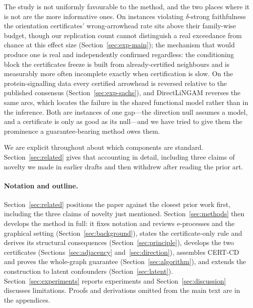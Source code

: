 \documentclass[pdflatex,sn-apa]{sn-jnl}
\theoremstyle{thmstyleone}%
\theoremstyle{thmstyletwo}%
\theoremstyle{thmstylethree}%
\begin{document}
The study is not uniformly favourable to the method, and the two places where
it is not are the more informative ones. On instances violating
$\delta$-strong faithfulness the orientation certificates' wrong-arrowhead
rate sits above their family-wise budget, though our replication count cannot
distinguish a real exceedance from chance at this effect size
(Section~\ref{sec:exp-main}); the mechanism that would produce one is real
and independently confirmed regardless: the conditioning block the
certificates freeze is built from already-certified neighbours and is
measurably more often incomplete exactly when certification is slow. On the
protein-signalling data
every certified arrowhead is reversed relative to the published consensus
(Section~\ref{sec:exp-sachs}), and DirectLiNGAM reverses the same arcs, which
locates the failure in the shared functional model rather than in the
inference. Both are instances of one gap---the direction null assumes a model,
and a certificate is only as good as its null---and we have tried to give them
the prominence a guarantee-bearing method owes them.

We are explicit throughout about which components are standard.
Section~\ref{sec:related} gives that accounting in detail, including three
claims of novelty we made in earlier drafts and then withdrew after reading
the prior art.

\paragraph{Notation and outline.} Section~\ref{sec:related} positions the
paper against the closest prior work first, including the three claims of
novelty just mentioned. Section~\ref{sec:methods} then develops the method in
full: it fixes notation and reviews e-processes and the graphical setting
(Section~\ref{sec:background}), states the certificate-only rule and derives
its structural consequences (Section~\ref{sec:principle}), develops the two
certificates (Sections~\ref{sec:adjacency} and~\ref{sec:direction}), assembles
CERT-CD and proves the whole-graph guarantee (Section~\ref{sec:algorithm}),
and extends the construction to latent confounders
(Section~\ref{sec:latent}). Section~\ref{sec:experiments} reports experiments
and Section~\ref{sec:discussion} discusses limitations. Proofs and
derivations omitted from the main text are in the appendices.
\end{document}
